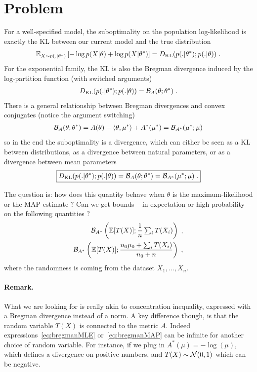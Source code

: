 \documentclass{article}
\newenvironment{important}{
	\begin{mdframed}[backgroundcolor=myblue, roundcorner=5pt]
}{		
	\end{mdframed}
}
\newcommand*{\expect}[2][]{\ensuremath{\mathbb{E}_{#1} \left[ #2 \right] }} %
\newcommand{\logpart}{A}
\newcommand{\conj}{\logpart^*}
\newcommand{\bregman}{\cB_\logpart}
\newcommand{\bregmanconj}{\cB_{\logpart^*}}
\newcommand{\natp}{\theta}
\newcommand{\meanp}{\mu}
\begin{document}
\section{Problem}
For a well-specified model, the suboptimality on the population log-likelihood is exactly the KL between our current model and the true distribution
\begin{align}
    \expect[X\sim p(.|\natp^*)]{-\log p(X|\natp) + \log p(X|\natp^*) }
	= \KL( p(.|\natp^*) ; p(.|\natp)) \; .
\end{align}
For the exponential family, the KL is also the Bregman divergence induced by the log-partition function (with switched arguments)
\begin{align}
	\KL( p(.|\natp^*) ; p(.|\natp)) 
	= \bregman (\natp ; \natp^*)  \; .
\end{align}
There is a general relationship between Bregman divergences and convex conjugates (notice the argument switching)
\begin{align}
	\bregman (\natp ; \natp^*)
    = \logpart(\natp) - \langle \natp , \mu^* \rangle + \conj(\mu^*)
    = \bregmanconj ( \meanp^* ; \meanp)
\end{align}
so in the end the suboptimality is a divergence, which can either be seen as a KL between distributions, as a divergence between natural parameters, or as a divergence between mean parameters
\begin{align}
\boxed{
	\KL( p(.|\natp^*) ; p(.|\natp))
    = \bregman (\natp ; \natp^*)
    = \bregmanconj ( \meanp^* ; \meanp) \; .
}
\end{align}
\begin{important}
The question is: how does this quantity behave when $\natp$ is the maximum-likelihood or the MAP estimate ? Can we get bounds -- in expectation or high-probability -- on the following quantities ?
\begin{align}
	\label{eq:bregmanMLE}
	\bregmanconj \left (\E [T(X)] ;  \inv{n}  \smallsum_i T(X_i) \right ) \; , \\
	\label{eq:bregmanMAP}
	\bregmanconj \left (\E [T(X)] ; \frac{n_0 \mu_0 + \smallsum_i T(X_i)}{n_0+n} \right ) \; ,
\end{align}
where the randomness is coming from the dataset $X_1, \dots, X_n$.
\end{important}

\paragraph{Remark.}
What we are looking for is really akin to concentration inequality, expressed with a Bregman divergence instead of a norm. A key difference though, is that the random variable $T(X)$ is connected to the metric $\logpart$. Indeed expressions~\eqref{eq:bregmanMLE} or~\eqref{eq:bregmanMAP} can be infinite for another choice of random variable. For instance, if we plug in $\conj(\mu)= -\log(\mu)$, which defines a divergence on positive numbers, and $T(X) \sim {\mathcal N}(0,1)$ which can be negative.
\end{document}
